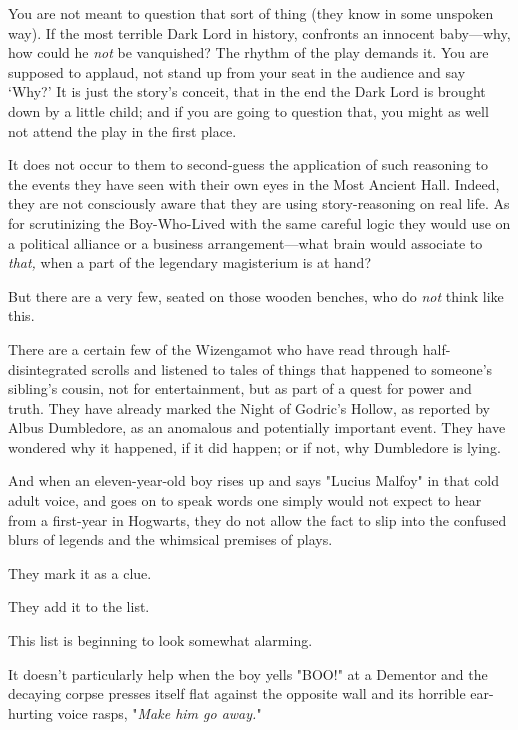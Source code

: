 You are not meant to question that sort of thing (they know in some unspoken
way). If the most terrible Dark Lord in history, confronts an innocent
baby—why, how could he \emph{not} be vanquished? The rhythm of the play
demands it. You are supposed to applaud, not stand up from your seat in the
audience and say `Why?' It is just the story's conceit, that in the end the
Dark Lord is brought down by a little child; and if you are going to question
that, you might as well not attend the play in the first place.

It does not occur to them to second-guess the application of such reasoning to
the events they have seen with their own eyes in the Most Ancient Hall. Indeed,
they are not consciously aware that they are using story-reasoning on real
life. As for scrutinizing the Boy-Who-Lived with the same careful logic they
would use on a political alliance or a business arrangement—what brain would
associate to \emph{that,} when a part of the legendary magisterium is at hand?

But there are a very few, seated on those wooden benches, who do \emph{not}
think like this.

There are a certain few of the Wizengamot who have read through
half-disintegrated scrolls and listened to tales of things that happened to
someone's sibling's cousin, not for entertainment, but as part of a quest for
power and truth. They have already marked the Night of Godric's Hollow, as
reported by Albus Dumbledore, as an anomalous and potentially important event.
They have wondered why it happened, if it did happen; or if not, why Dumbledore
is lying.

And when an eleven-year-old boy rises up and says "Lucius Malfoy" in that cold
adult voice, and goes on to speak words one simply would not expect to hear
from a first-year in Hogwarts, they do not allow the fact to slip into the
confused blurs of legends and the whimsical premises of plays.

They mark it as a clue.

They add it to the list.

This list is beginning to look somewhat alarming.

It doesn't particularly help when the boy yells "BOO!" at a Dementor and the
decaying corpse presses itself flat against the opposite wall and its horrible
ear-hurting voice rasps, "\emph{Make him go away.}"
